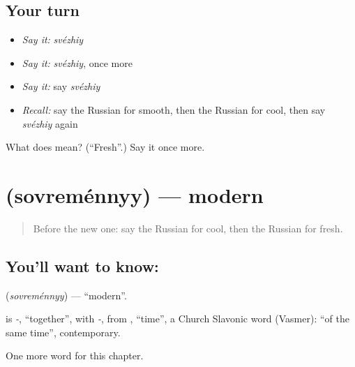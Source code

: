 \subsection*{Your turn}
\begin{itemize}
\raggedright
  \item \emph{Say it:} \emph{svézhiy}
  \item \emph{Say it:} \emph{svézhiy}, once more
  \item \emph{Say it:} say \emph{svézhiy}
  \item \emph{Recall:} say the Russian for smooth, then the Russian for cool, then say \emph{svézhiy} again
\end{itemize}

\begin{tcolorbox}[breakable,colback=teal!4,colframe=teal!35!black,title={Before you move on}]
What does  mean? (\textquotedblleft{}Fresh\textquotedblright{}.) Say it once more.
\end{tcolorbox}
\section[\texorpdfstring{\ru{современный} (sovreménnyy)}{современный (sovreménnyy)}]{ (sovreménnyy) — modern}

\label{lesson:RU-C217-sovremennyy}



\begin{quote}
Before the new one: say the Russian for cool, then the Russian for fresh.
\end{quote}

\subsection*{You'll want to know: }
\textbf{} (\emph{sovreménnyy}) — \textquotedblleft{}modern\textquotedblright{}.

\begin{cousinweb}
\textbf{} is \emph{-}, \textquotedblleft{}together\textquotedblright{}, with \emph{-}, from \emph{}, \textquotedblleft{}time\textquotedblright{}, a Church Slavonic word (Vasmer): \textquotedblleft{}of the same time\textquotedblright{}, contemporary.
\end{cousinweb}

\begin{grammarlens}[title={What you've built}]
One more word for this chapter.
\end{grammarlens}

